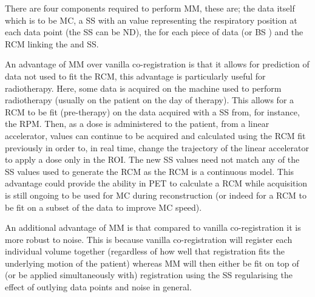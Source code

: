             There are four components required to perform \gls{MM}, these are; the data itself which is to be \gls{MC}, a \gls{SS} with an value representing the respiratory position at each data point (the \gls{SS} can be \gls{ND}), the  for each piece of data (or \gls{BS} ) and the \gls{RCM} linking the  and \gls{SS}.
            
            An advantage of \gls{MM} over vanilla co-registration is that it allows for prediction of data not used to fit the \gls{RCM}, this advantage is particularly useful for radiotherapy. Here, some data is acquired on the machine used to perform radiotherapy (usually on the patient on the day of therapy). This allows for a \gls{RCM} to be fit (pre-therapy) on the data acquired with a \gls{SS} from, for instance, the \gls{RPM}. Then, as a dose is administered to the patient, from a linear accelerator,  values can continue to be acquired and  calculated using the \gls{RCM} fit previously in order to, in real time, change the trajectory of the linear accelerator to apply a dose only in the \gls{ROI}. The new \gls{SS} values need not match any of the \gls{SS} values used to generate the \gls{RCM} as the \gls{RCM} is a continuous model. This advantage could provide the ability in \gls{PET} to calculate a \gls{RCM} while acquisition is still ongoing to be used for \gls{MC} during reconstruction (or indeed for a \gls{RCM} to be fit on a subset of the data to improve \gls{MC} speed).
            
            An additional advantage of \gls{MM} is that compared to vanilla co-registration it is more robust to noise. This is because vanilla co-registration will register each individual volume together (regardless of how well that registration fits the underlying motion of the patient) whereas \gls{MM} will then either be fit on top of (or be applied simultaneously with) registration using the \gls{SS} regularising the effect of outlying data points and noise in general.
            
